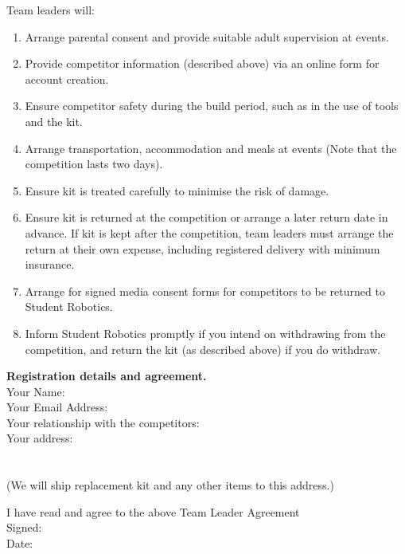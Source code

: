 \documentclass[a4paper, 11pt]{scrartcl}
\begin{document}
Team leaders will:

\begin{enumerate}
\item Arrange parental consent and provide suitable adult supervision at
events.

\item Provide competitor information (described above) via an online form for
account creation.

\item Ensure competitor safety during the build period, such as in the use of
tools and the kit.

\item Arrange transportation, accommodation and meals at events (Note that
the competition lasts two days).

\item Ensure kit is treated carefully to minimise the risk of damage.

\item Ensure kit is returned at the competition or arrange a later return
date in advance.  If kit is kept after the competition, team leaders must
arrange the return at their own expense, including registered delivery with
minimum  insurance.

\item Arrange for signed media consent forms for competitors to be returned
to Student Robotics.

\item Inform Student Robotics promptly if you intend on withdrawing from the
competition, and return the kit (as described above) if you do withdraw.

\end{enumerate}

\noindent
\textbf{Registration details and agreement.} \\
\doublespacing
\noindent
Your Name:\hrulefill\\
Your Email Address:\hrulefill\\
Your relationship with the competitors:\hrulefill\\
Your address:\hrulefill\\
\hbox{}\hrulefill\\
\hbox{}\hrulefill\\
(We will ship replacement kit and any other items to this address.)

\noindent
\dotfill\hfill

\noindent
I have read and agree to the above Team Leader Agreement\\
Signed:\hrulefill\\
Date:\hrulefill\\

\singlespacing
\end{document}
